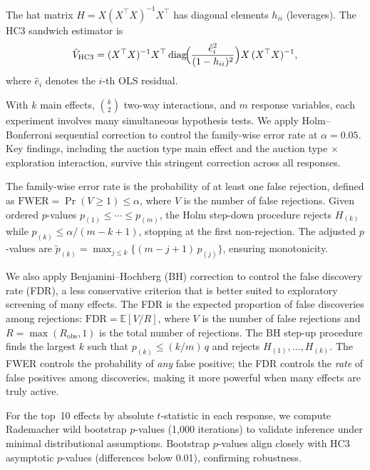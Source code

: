 The hat matrix $H = X(X^\top X)^{-1}X^\top$ has diagonal elements $h_{ii}$ (leverages). The HC3 sandwich estimator is
\begin{align}
  \hat{V}_{\text{HC3}} = (X^\top X)^{-1} X^\top \operatorname{diag}\!\Bigl(\frac{\hat{e}_i^2}{(1-h_{ii})^2}\Bigr) X\, (X^\top X)^{-1},
  \label{eq:hc3}
\end{align}
where $\hat{e}_i$ denotes the $i$-th OLS residual.

With $k$ main effects, $\binom{k}{2}$ two-way interactions, and $m$ response variables, each experiment involves many simultaneous hypothesis tests. We apply Holm--Bonferroni sequential correction \citep{Holm1979} to control the family-wise error rate at $\alpha = 0.05$. Key findings, including the auction type main effect and the auction type $\times$ exploration interaction, survive this stringent correction across all responses.

The family-wise error rate is the probability of at least one false rejection, defined as $\text{FWER} = \Pr(V \geq 1) \leq \alpha$, where $V$ is the number of false rejections. Given ordered $p$-values $p_{(1)} \leq \cdots \leq p_{(m)}$, the Holm step-down procedure rejects $H_{(k)}$ while $p_{(k)} \leq \alpha/(m - k + 1)$, stopping at the first non-rejection. The adjusted $p$-values are $\tilde{p}_{(k)} = \max_{j \leq k}\{(m - j + 1)\,p_{(j)}\}$, ensuring monotonicity.

We also apply Benjamini--Hochberg (BH) correction \citep{BenjaminiHochberg1995} to control the false discovery rate (FDR), a less conservative criterion that is better suited to exploratory screening of many effects. The FDR is the expected proportion of false discoveries among rejections: $\text{FDR} = \mathbb{E}[V/R]$, where $V$ is the number of false rejections and $R = \max(R_{\text{obs}}, 1)$ is the total number of rejections. The BH step-up procedure finds the largest $k$ such that $p_{(k)} \leq (k/m)\,q$ and rejects $H_{(1)}, \ldots, H_{(k)}$. The FWER controls the probability of \emph{any} false positive; the FDR controls the \emph{rate} of false positives among discoveries, making it more powerful when many effects are truly active.

For the top~10 effects by absolute $t$-statistic in each response, we compute Rademacher wild bootstrap $p$-values (1{,}000 iterations) to validate inference under minimal distributional assumptions. Bootstrap $p$-values align closely with HC3 asymptotic $p$-values (differences below 0.01), confirming robustness.

